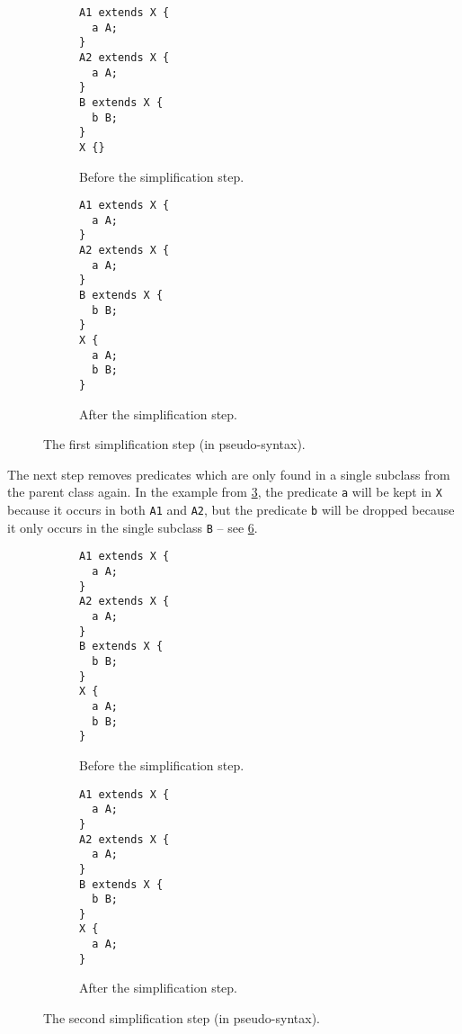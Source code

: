 \begin{figure}[h]
  \begin{subfigure}[t]{0.45\textwidth}
    \begin{lstlisting}
A1 extends X {
  a A;
}
A2 extends X {
  a A;
}
B extends X {
  b B;
}
X {}
    \end{lstlisting}
    \caption{Before the simplification step.}
    \label{fig:simplify-7.4.2-before}
  \end{subfigure}
  \begin{subfigure}[t]{0.45\textwidth}
    \begin{lstlisting}
A1 extends X {
  a A;
}
A2 extends X {
  a A;
}
B extends X {
  b B;
}
X {
  a A;
  b B;
}
    \end{lstlisting}
    \caption{After the simplification step.}
    \label{fig:simplify-7.4.2-after}
  \end{subfigure}
  \caption{The first simplification step (in pseudo-syntax).}
  \label{fig:simplify-7.4.2}
\end{figure}

The next step removes predicates which are only found in a single subclass
from the parent class again.
In the example from \cref{fig:simplify-7.4.2},
the predicate \lstinline{a} will be kept in \lstinline{X}
because it occurs in both \lstinline{A1} and \lstinline{A2},
but the predicate \lstinline{b} will be dropped
because it only occurs in the single subclass \lstinline{B} –
see \cref{fig:simplify-7.4.3}.

\begin{figure}[h]
  \begin{subfigure}[t]{0.45\textwidth}
    \begin{lstlisting}
A1 extends X {
  a A;
}
A2 extends X {
  a A;
}
B extends X {
  b B;
}
X {
  a A;
  b B;
}
    \end{lstlisting}
    \caption{Before the simplification step.}
    \label{fig:simplify-7.4.3-before}
  \end{subfigure}
  \begin{subfigure}[t]{0.45\textwidth}
    \begin{lstlisting}
A1 extends X {
  a A;
}
A2 extends X {
  a A;
}
B extends X {
  b B;
}
X {
  a A;
}
    \end{lstlisting}
    \caption{After the simplification step.}
    \label{fig:simplify-7.4.3-after}
  \end{subfigure}
  \caption{The second simplification step (in pseudo-syntax).}
  \label{fig:simplify-7.4.3}
\end{figure}

